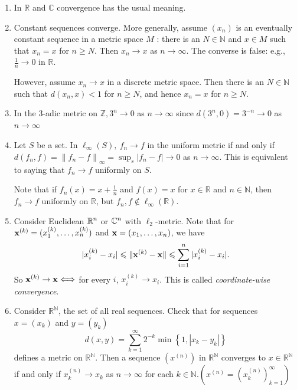 \documentclass[a4paper]{article}
\begin{document}
\begin{example}
    \begin{enumerate}
        \item In $\mathbb{R}$ and $\mathbb{C}$ convergence has the usual meaning.
        \item Constant sequences converge. More generally, assume $\left(x_{n}\right)$ is an eventually constant sequence in a metric space $M$ : there is an $N \in \mathbb{N}$ and $x \in M$ such that $x_{n}=x$ for $n \geqslant N$. Then $x_{n} \rightarrow x$ as $n \rightarrow \infty$.
        The converse is false: e.g., $\frac{1}{n} \rightarrow 0$ in $\mathbb{R}$.

        However, assume $x_{n} \rightarrow x$ in a discrete metric space. Then there is an $N \in \mathbb{N}$ such that $d\left(x_{n}, x\right)<1$ for $n \geqslant N$, and hence $x_{n}=x$ for $n \geqslant N$.
        \item In the 3-adic metric on $\mathbb{Z}, 3^{n} \rightarrow 0$ as $n \rightarrow \infty$ since $d\left(3^{n}, 0\right)=3^{-n} \rightarrow 0$ as $n \rightarrow \infty$
        \item Let $S$ be a set. In $\ell_{\infty}(S),\ f_{n} \rightarrow f$ in the uniform metric if and only if $d\left(f_{n}, f\right)=\left\|f_{n}-f\right\|_{\infty}=\sup _{s}\left|f_{n}-f\right| \rightarrow 0$ as $n \rightarrow \infty$. This is equivalent to saying that $f_{n} \rightarrow f$ uniformly on $S$.
        
        Note that if $f_{n}(x)=x+\frac{1}{n}$ and $f(x)=x$ for $x \in \mathbb{R}$ and $n \in \mathbb{N}$, then $f_{n} \rightarrow f$ uniformly on $\mathbb{R}$, but $f_{n}, f \notin \ell_{\infty}(\mathbb{R})$.
        \item Consider Euclidean $ {\mathbb{R}}^n $ or $ {\mathbb{C}}^n $ with $ \ell_2 $-metric. Note that for $ {\bf x}^{(k)}=(x_1^{(k)},\dots,x_n^{(k)}) $ and $ {\bf x}=(x_1,\dots,x_n) $, we have 
        \[
            | x_i^{(k)}-x_i | \leqslant \| {\bf x}^{(k)}-{\bf x} \| \leqslant \sum_{i=1}^{n}| x_i^{(k)}-x_i |.
        \]
        So $ {\bf x}^{(k)}\to {\bf x} \Longleftrightarrow $ for every $i$, $ x_i^{(k)}\to x_i $. This is called \textit{coordinate-wise convergence}.
        \item Consider $\mathbb{R}^{\mathbb{N}}$, the set of all real sequences. Check that for sequences $x=\left(x_{k}\right)$ and $y=\left(y_{k}\right)$
        \[
        d(x, y)=\sum_{k=1}^{\infty} 2^{-k} \min \left\{1,\left|x_{k}-y_{k}\right|\right\}
        \]
        defines a metric on $\mathbb{R}^{\mathbb{N}}$. Then a sequence $\left(x^{(n)}\right)$ in $\mathbb{R}^{\mathbb{N}}$ converges to $x \in \mathbb{R}^{\mathbb{N}}$ if and only if $x_{k}^{(n)} \rightarrow x_{k}$ as $n \rightarrow \infty$ for each $k \in \mathbb{N} .\left(x^{(n)}=\left(x_{k}^{(n)}\right)_{k=1}^{\infty}\right)$ 
        

\end{enumerate}
\end{example}
\end{document}

